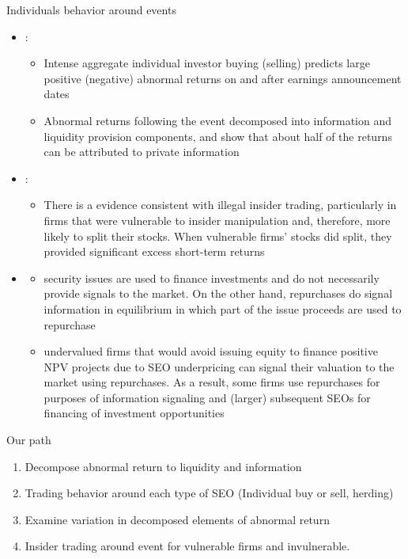 \documentclass{beamer}
\begin{document}
\begin{frame}{Individuals behavior around events}
	\begin{itemize}\scriptsize
		\item 	\cite{kaniel2012individual} :
		\begin{itemize}\tiny
			\item Intense
			aggregate individual investor buying (selling) predicts large positive (negative) abnormal returns on and after earnings announcement dates
			\item 
			Abnormal returns following the event decomposed  into information and liquidity provision components, and show that about half of the returns can be attributed to private information
		\end{itemize} 
	\item \cite{nguyen2017stock}:
	\begin{itemize}\tiny
		\item There is a evidence consistent with illegal insider trading,
	particularly in firms that were vulnerable to insider manipulation and, therefore, more likely to split
	their stocks. When vulnerable firms’ stocks did split, they provided significant excess short-term
	returns
		
	
	
	\end{itemize}
	\item 
	\begin{itemize}\tiny
		\item  \cite{constantinides1989optimal}
		security issues are used to finance investments and do not necessarily provide signals to the
		market. On the other hand, repurchases do signal information in equilibrium in which part of the
		issue proceeds are used to repurchase
		\item \cite{bond2016buying} undervalued firms that
		would avoid issuing equity to finance positive NPV projects due to SEO underpricing can signal
		their valuation to the market using repurchases. As a result, some firms use repurchases for
		purposes of information signaling and (larger) subsequent SEOs for financing of investment opportunities
	\end{itemize}
	\end{itemize}
\end{frame}
\begin{frame}{Our path}
	\begin{enumerate}
		\item Decompose abnormal return to liquidity and information
		\item Trading behavior around each type of SEO (Individual buy or sell, herding)
		\item Examine variation in decomposed elements of abnormal return
		\item Insider trading around event for vulnerable firms and invulnerable.
	\end{enumerate}
\end{frame}
\end{document}
